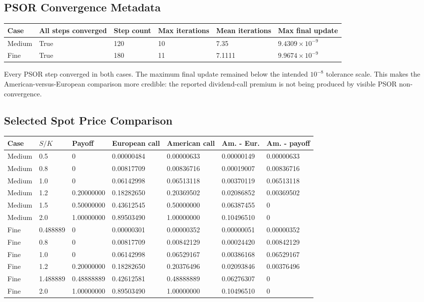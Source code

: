 \documentclass[11pt,a4paper]{article}
\begin{document}
\subsection{PSOR Convergence Metadata}

{\footnotesize
\setlength{\tabcolsep}{3pt}
\begin{longtable}{@{}L{0.10\textwidth}L{0.17\textwidth}L{0.11\textwidth}L{0.13\textwidth}L{0.13\textwidth}L{0.16\textwidth}@{}}
\toprule
Case & All steps converged & Step count & Max iterations & Mean iterations & Max final update \\
\midrule
\endhead
Medium & True & 120 & 10 & 7.35 & \(9.4309\times10^{-9}\) \\
Fine & True & 180 & 11 & 7.1111 & \(9.9674\times10^{-9}\) \\
\bottomrule
\end{longtable}
}

Every PSOR step converged in both cases. The maximum final update remained below the intended
\(10^{-8}\) tolerance scale. This makes the American-versus-European comparison more credible:
the reported dividend-call premium is not being produced by visible PSOR non-convergence.

\subsection{Selected Spot Price Comparison}

{\footnotesize
\begin{longtable}{@{}L{0.10\textwidth}L{0.09\textwidth}L{0.11\textwidth}L{0.13\textwidth}L{0.13\textwidth}L{0.13\textwidth}L{0.13\textwidth}@{}}
\toprule
Case & \(S/K\) & Payoff & European call & American call & Am. - Eur. & Am. - payoff \\
\midrule
\endhead
Medium & 0.5 & 0 & 0.00000484 & 0.00000633 & 0.00000149 & 0.00000633 \\
Medium & 0.8 & 0 & 0.00817709 & 0.00836716 & 0.00019007 & 0.00836716 \\
Medium & 1.0 & 0 & 0.06142998 & 0.06513118 & 0.00370119 & 0.06513118 \\
Medium & 1.2 & 0.20000000 & 0.18282650 & 0.20369502 & 0.02086852 & 0.00369502 \\
Medium & 1.5 & 0.50000000 & 0.43612545 & 0.50000000 & 0.06387455 & 0 \\
Medium & 2.0 & 1.00000000 & 0.89503490 & 1.00000000 & 0.10496510 & 0 \\
Fine & 0.488889 & 0 & 0.00000301 & 0.00000352 & 0.00000051 & 0.00000352 \\
Fine & 0.8 & 0 & 0.00817709 & 0.00842129 & 0.00024420 & 0.00842129 \\
Fine & 1.0 & 0 & 0.06142998 & 0.06529167 & 0.00386168 & 0.06529167 \\
Fine & 1.2 & 0.20000000 & 0.18282650 & 0.20376496 & 0.02093846 & 0.00376496 \\
Fine & 1.488889 & 0.48888889 & 0.42612581 & 0.48888889 & 0.06276307 & 0 \\
Fine & 2.0 & 1.00000000 & 0.89503490 & 1.00000000 & 0.10496510 & 0 \\
\bottomrule
\end{longtable}
}
\end{document}
